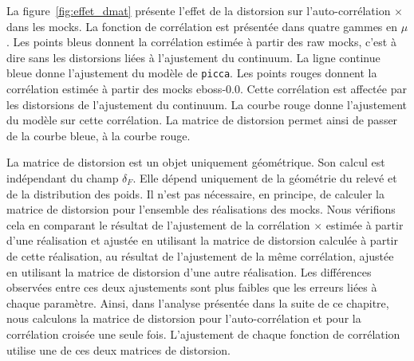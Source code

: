 La figure~\ref{fig:effet_dmat} présente l'effet de la distorsion sur l'auto-corrélation \lya{}$\times$\lya{} dans les mocks. La fonction de corrélation est présentée dans quatre gammes en $\mu$. Les points bleus donnent la corrélation estimée à partir des raw mocks, c'est à dire sans les distorsions liées à l'ajustement du continuum. La ligne continue bleue donne l'ajustement du modèle de \texttt{picca}. Les points rouges donnent la corrélation estimée à partir des mocks eboss-0.0. Cette corrélation est affectée par les distorsions de l'ajustement du continuum. La courbe rouge donne l'ajustement du modèle sur cette corrélation. La matrice de distorsion permet ainsi de passer de la courbe bleue, à la courbe rouge.

La matrice de distorsion est un objet uniquement géométrique. Son calcul est indépendant du champ $\delta_F$. Elle dépend uniquement de la géométrie du relevé et de la distribution des poids.
  Il n'est pas nécessaire, en principe, de calculer la matrice de distorsion pour l'ensemble des réalisations des mocks.
  Nous vérifions cela en comparant le résultat de l'ajustement de la corrélation \lya{}$\times$\lya{} estimée à partir d'une réalisation et ajustée en utilisant la matrice de distorsion calculée à partir de cette réalisation, au résultat de l'ajustement de la même corrélation, ajustée en utilisant la matrice de distorsion d'une autre réalisation. Les différences observées entre ces deux ajustements sont plus faibles que les erreurs liées à chaque paramètre.
Ainsi, dans l'analyse présentée dans la suite de ce chapitre, nous calculons la matrice de distorsion pour l'auto-corrélation et pour la corrélation croisée une seule fois. L'ajustement de chaque fonction de corrélation utilise une de ces deux matrices de distorsion.

